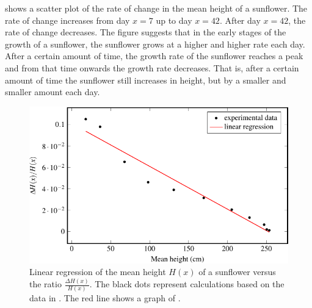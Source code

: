 \documentclass[a4paper,oneside,12pt]{article}
\begin{document}
\begin{problem}
{\begin{solution}
 shows a scatter plot
of the rate of change in the mean height of a sunflower.  The rate of
change increases from day $x = 7$ up to day $x = 42$.  After day
$x = 42$, the rate of change decreases.  The figure suggests that in
the early stages of the growth of a sunflower, the sunflower grows at
a higher and higher rate each day.  After a certain amount of time,
the growth rate of the sunflower reaches a peak and from that time
onwards the growth rate decreases.  That is, after a certain amount of
time the sunflower still increases in height, but by a smaller and
smaller amount each day.

\begin{figure}[!htbp]
\centering
\includegraphics[scale=1.1]{image/12/sunflower-regression.pdf}
\caption{%
  Linear regression of the mean height $H(x)$ of a sunflower versus
  the ratio $\frac{\Delta H(x)}{H(x)}$.  The black dots represent
  calculations based on the data in .
  The red line shows a graph of
  .
}
\label{fig:logarithm:logistic_sunflower_regression}
\end{figure}


\end{solution}}
\end{problem}
\end{document}
